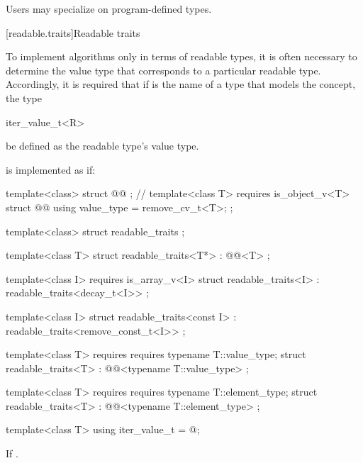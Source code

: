 \begin{addedblock}
\pnum
Users may specialize  on program-defined types.

[readable.traits]{Readable traits}

\pnum
To implement algorithms only in terms of readable types, it is often necessary
to determine the value type that corresponds to a particular readable type.
Accordingly, it is required that if  is the name of a type that
models the  concept,
the type

\begin{codeblock}
iter_value_t<R>
\end{codeblock}

be defined as the readable type's value type.

{\color{oldclr}
\pnum
{} is implemented as if:
} %

%
%
\begin{codeblock}
  template<class> struct @@ { }; // \expos
  template<class T>
    requires is_object_v<T>
  struct @@ {
    using value_type = remove_cv_t<T>;
  };

  template<class> struct readable_traits { };

  template<class T>
  struct readable_traits<T*>
    : @@<T> { };

  template<class I>
    requires is_array_v<I>
  struct readable_traits<I>
    : readable_traits<decay_t<I>> { };

  template<class I>
  struct readable_traits<const I>
    : readable_traits<remove_const_t<I>> { };

  template<class T>
    requires requires { typename T::value_type; }
  struct readable_traits<T>
    : @@<typename T::value_type> { };

  template<class T>
    requires requires { typename T::element_type; }
  struct readable_traits<T>
    : @@<typename T::element_type> { };

  template<class T> using iter_value_t = @\seebelownc@;
\end{codeblock}

\pnum
If  
.


\end{addedblock}
